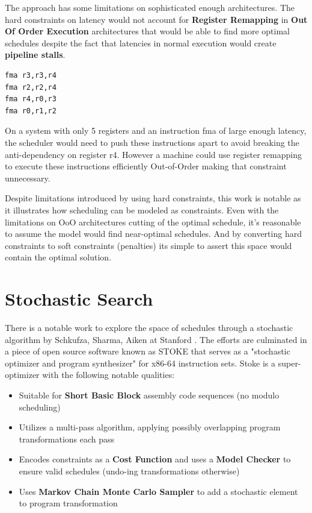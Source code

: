\documentclass[12pt]{report}
\def\mytitle{??? Program Code ???}
\begin{document}
The approach has some limitations on sophisticated enough architectures. The
hard constraints on latency would not account for \textbf{Register Remapping} in
\textbf{Out Of Order Execution} architectures that would be able to find more
optimal schedules despite the fact that latencies in normal execution would
create \textbf{pipeline stalls}.

\def\mytitle{{\sc Assembly Code Example Requiring Register Renaming for Optimal Scheduling \hspace{12em} \color{grey}{.} }}
\begin{verbatim}
fma r3,r3,r4
fma r2,r2,r4
fma r4,r0,r3
fma r0,r1,r2
\end{verbatim}
On a system with only 5 registers and an instruction fma of large enough
latency, the scheduler would need to push these instructions apart to avoid
breaking the anti-dependency on register r4. However a machine
could use register remapping to execute these instructions efficiently Out-of-Order
making that constraint unnecessary. 

Despite limitations introduced by using hard constraints, this work is
notable as it illustrates how scheduling can be modeled as constraints. Even
with the limitations on OoO architectures cutting of the optimal schedule,
it's reasonable to assume the model would find near-optimal schedules. And by
converting hard constraints to soft constraints (penalties) its simple to
assert this space would contain the optimal solution.

\section{Stochastic Search}
\label{sec:orgdfa9356}
There is a notable work to explore the space of schedules through a
stochastic algorithm by Schkufza, Sharma, Aiken at Stanford
\parencite{Schkufza:2016:SPO:2886013.2863701}. The efforts are culminated in
a piece of open source software known as STOKE that serves as a "stochastic
optimizer and program synthesizer" for x86-64 instruction sets. Stoke is a
super-optimizer with the following notable qualities:

\begin{itemize}
\item Suitable for \textbf{Short Basic Block} assembly code sequences (no modulo scheduling)
\item Utilizes a multi-pass algorithm, applying possibly overlapping program
transformations each pass
\item Encodes constraints as a \textbf{Cost Function} and uses a \textbf{Model Checker} to
ensure valid schedules (undo-ing transformations otherwise)
\item Uses \textbf{Markov Chain Monte Carlo Sampler} to add a stochastic element to
program transformation
\end{itemize}
\end{document}
